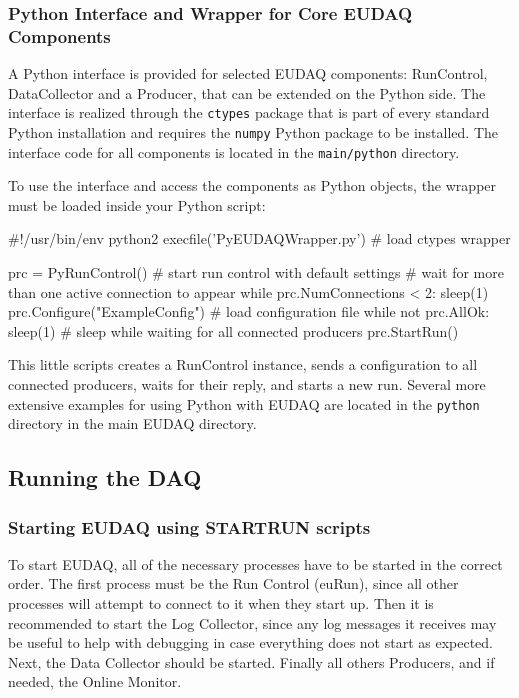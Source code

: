 \subsubsection{Python Interface and Wrapper for Core EUDAQ Components}
\label{sssec:pywrapper}
A Python interface is provided for selected EUDAQ components:
RunControl, DataCollector and a Producer, that can be extended on the
Python side. The interface is realized through the \texttt{ctypes}
package that is part of every standard Python installation and
requires the \texttt{numpy} Python package to be installed. The
interface code for all components is located in the
\texttt{main/python} directory.

To use the interface and access the components as Python objects, the
wrapper must be loaded inside your Python script:

\begin{listing}[python]
  #!/usr/bin/env python2 
  execfile('PyEUDAQWrapper.py') # load ctypes wrapper

  prc = PyRunControl() # start run control with default settings
  # wait for more than one active connection to appear
  while prc.NumConnections < 2:
      sleep(1)
  prc.Configure("ExampleConfig") # load configuration file
  while not prc.AllOk:
      sleep(1) # sleep while waiting for all connected producers
  prc.StartRun()
\end{listing}

This little scripts creates a RunControl instance, sends a
configuration to all connected producers, waits for their reply, and
starts a new run. Several more extensive examples for using Python
with EUDAQ are located in the \texttt{python} directory in the main
EUDAQ directory.

\subsection{Running the DAQ}

\subsubsection{Starting EUDAQ using STARTRUN scripts}\label{sec:STARTRUN}
To start EUDAQ, all of the necessary processes have to be started in the correct order.
The first process must be the Run Control (euRun),
since all other processes will attempt to connect to it when they start up.
Then it is recommended to start the Log Collector,
since any log messages it receives may be useful
to help with debugging in case everything does not start as expected.
Next, the Data Collector should be started.
Finally all others Producers, and if needed, the Online Monitor.

